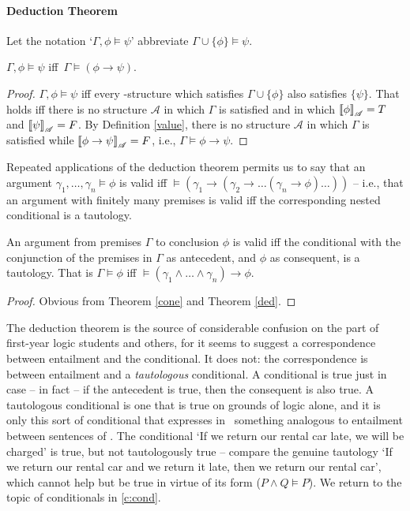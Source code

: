 \paragraph{Deduction Theorem}
	Let the notation `$\Gamma,\phi \vDash \psi$' abbreviate $\Gamma \cup\{\phi\} \vDash \psi$. \begin{theorem}[Deduction]\label{ded} $\Gamma,\phi \vDash \psi$ iff\, $\Gamma \vDash (\phi \to \psi)$. 
\begin{proof}
$\Gamma, \phi \vDash \psi$ iff  every \lone-structure which satisfies $\Gamma\cup\{\phi\}$ also satisfies $\{\psi\}$. That holds iff there is no structure $\mathscr{A}$ in which $\Gamma$ is satisfied and in which $\left\llbracket \phi\right\rrbracket_{\mathscr{A}}=T$ and $\left\llbracket \psi\right\rrbracket_{\mathscr{A}}=F$. By Definition \ref{value}, there is no structure $\mathscr{A}$ in which $\Gamma$ is satisfied while $\left\llbracket \phi\to\psi\right\rrbracket_{\mathscr{A}}=F$, i.e., $\Gamma\vDash\phi\to\psi$.
\end{proof}
\end{theorem}
Repeated applications of the deduction theorem permits us to say that an argument $\gamma_{1},\ldots,\gamma_{n} \vDash \phi$ is valid iff $\vDash (\gamma_{1} \to (\gamma_{2} \to …(\gamma_{n}\to \phi)…))$ – i.e., that an argument with finitely many premises is valid iff the corresponding nested conditional is a tautology.\begin{corol}
	An argument from premises $\Gamma$ to conclusion $\phi$ is valid iff the conditional with the conjunction of the premises in $\Gamma$ as antecedent, and $\phi$ as consequent, is a tautology. That is $\Gamma\vDash\phi$ iff $\vDash (\gamma_{1}\wedge\ldots\wedge\gamma_{n}) \to \phi$. \begin{proof}
		Obvious from Theorem \ref{cone} and Theorem \ref{ded}.
	\end{proof}
\end{corol} The deduction theorem is the source of considerable confusion on the part of first-year logic students and others, for it seems to suggest a correspondence between entailment and the conditional. It does not: the correspondence is between entailment and a \emph{tautologous} conditional. A conditional is true just in case – in fact – if the antecedent is true, then the consequent is also true. A tautologous conditional is one that is true on grounds of logic alone, and it is only this sort of conditional that expresses in \lone\ something analogous to entailment between sentences of \lone. The conditional `If we return our rental car late, we will be charged' is true, but not tautologously true – compare the genuine tautology `If we return our rental car and we return it late, then we return our rental car', which cannot help but be true in virtue of its form ($P\wedge Q \vDash P$). We return to the topic of conditionals in \autoref{c:cond}.





